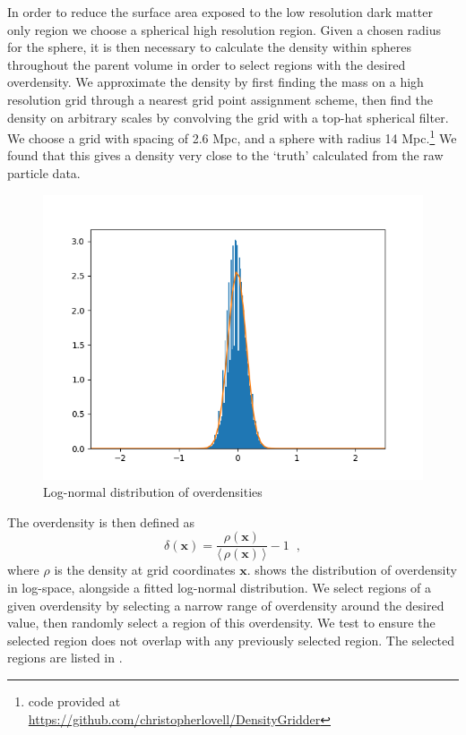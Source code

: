 In order to reduce the surface area exposed to the low resolution dark matter only region we choose a spherical high resolution region.
Given a chosen radius for the sphere, it is then necessary to calculate the density within spheres throughout the parent volume in order to select regions with the desired overdensity.
We approximate the density by first finding the mass on a high resolution grid through a nearest grid point assignment  scheme, then find the density on arbitrary scales by convolving the grid with a top-hat spherical filter.
We choose a grid with spacing of 2.6 Mpc, and a sphere with radius 14 Mpc.\footnote{code provided at \\\href{https://github.com/christopherlovell/DensityGridder}{https://github.com/christopherlovell/DensityGridder}}
We found that this gives a density very close to the `truth' calculated from the raw particle data.

\begin{figure}
	\includegraphics[width=\columnwidth]{images/log_fit.png}
    \caption{Log-normal distribution of overdensities}
    \label{fig:log_fit}
\end{figure}

The overdensity is then defined as
\begin{equation}
	\delta(\textbf{x}) = \frac{\rho(\textbf{x})}{\langle \, \rho(\textbf{x}) \, \rangle} - 1 \;\;,
\end{equation}
where $\rho$ is the density at grid coordinates $\textbf{x}$.
 shows the distribution of overdensity in log-space, alongside a fitted log-normal distribution.
We select regions of a given overdensity by selecting a narrow range of overdensity around the desired value, then randomly select a region of this overdensity.
We test to ensure the selected region does not overlap with any previously selected region.
The selected regions are listed in .


